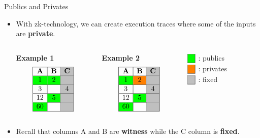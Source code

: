 \begin{frame}[allowframebreaks]{Publics and Privates}
\begin{itemize}
\item With zk-technology, we can create execution traces
where some of the inputs are \textbf{private}.
\vspace{0.3cm}
\begin{columns}
\begin{column}{0.33\textwidth}
\textbf{Example 1} \centering
$$
\begin{array}{|c|c|c|}
\hline
\textbf{A} & \textbf{B} & \cellcolor{lightgray} \textbf{C} \\ \hline
1 \cellcolor{green} & 2 \cellcolor{green}
& \cellcolor{lightgray} \\ \hline
3 & & 4 \cellcolor{lightgray} \\ \hline
12 & 5 \cellcolor{green} &
\cellcolor{lightgray} \\ \hline
60 \cellcolor{green} & & \cellcolor{lightgray}
\\ \hline
\end{array}$$
\end{column}
\begin{column}{0.33\textwidth}
\textbf{Example 2} \centering
$$
\begin{array}{|c|c|c|}
\hline
\textbf{A} & \textbf{B} & \cellcolor{lightgray} \textbf{C} \\ \hline
1 \cellcolor{green} & 2 \cellcolor{orange} &
\cellcolor{lightgray} \\ \hline
3 & & 4 \cellcolor{lightgray} \\ \hline
12 & 5 \cellcolor{green} &
\cellcolor{lightgray} \\ \hline
60 \cellcolor{green} & &
\cellcolor{lightgray} \\ \hline
\end{array}$$
\end{column}
\begin{column}{0.33\textwidth}
$\begin{array}{|c|}
\hline
\cellcolor{green}\\ \hline
\end{array}$
: publics \\ \vspace{0.2cm}
$\begin{array}{|c|} \hline
\cellcolor{orange}\\ \hline
\end{array}$
: privates \\ \vspace{0.2cm}
$\begin{array}{|c|} \hline
\cellcolor{lightgray}\\ \hline
\end{array}$
: fixed
\end{column}
\end{columns}
\vspace{0.3cm}
\item Recall that columns A and B are \textbf{witness} while the C column is
\textbf{fixed}.
\end{itemize}



\end{frame}
